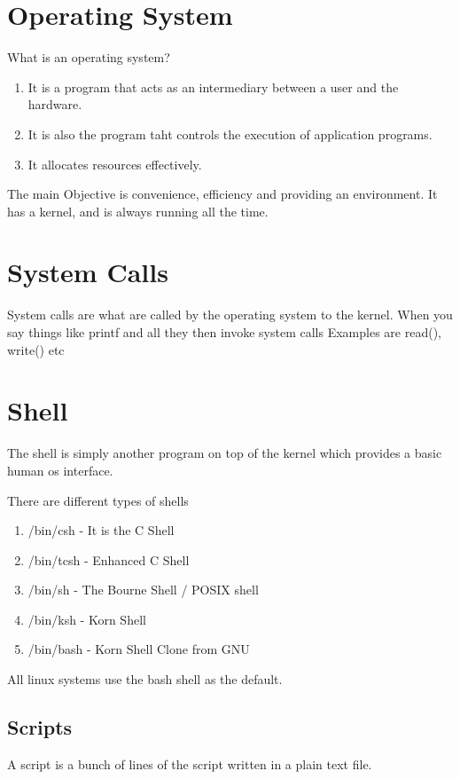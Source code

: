 \documentclass[11pt]{article}
\begin{document}
\clearpage
\tableofcontents
\clearpage

\section{Operating System}
What is an operating system?

\begin{enumerate}
	\item It is a program that acts as an intermediary between a user and the hardware.
	\item It is also the program taht controls the execution of application programs.
	\item It allocates resources effectively.
\end{enumerate}

The main Objective is convenience, efficiency and providing an environment. It has a kernel, and is always running all the time.


\section{System Calls}

System calls are what are called by the operating system to the kernel. When you say things like printf and all they then invoke system calls
Examples are read(), write() etc

\section{Shell}
The shell is simply another program on top of the kernel which provides a basic human os interface.

There are different types of shells

\begin{enumerate}
	\item /bin/csh - It is the C Shell
	\item /bin/tcsh - Enhanced C Shell
	\item /bin/sh - The Bourne Shell / POSIX shell
	\item /bin/ksh - Korn Shell
	\item /bin/bash - Korn Shell Clone from GNU
\end{enumerate}

All linux systems use the bash shell as the default.

\subsection{Scripts}
A script is a bunch of lines of the script written in a plain text file.
\end{document}
